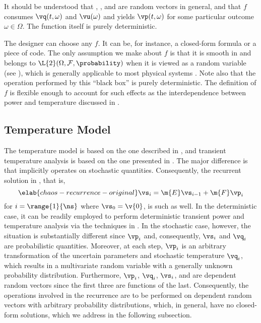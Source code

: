 \begin{remark}
It should be understood that \vp, \vq, and \vu are random vectors in general,
and that $f$ consumes $\vq(t, \omega)$ and $\vu(\omega)$ and yields $\vp(t,
\omega)$ for some particular outcome $\omega \in \Omega$. The function itself is
purely deterministic.
\end{remark}

The designer can choose any $f$. It can be, for instance, a closed-form formula
or a piece of code. The only assumption we make about $f$ is that it is smooth
in \vz and belongs to $\L{2}(\Omega, \mathcal{F}, \probability)$ when it is
viewed as a random variable (see ), which is generally
applicable to most physical systems \cite{xiu2010}. Note also that the operation
performed by this ``black box'' is purely deterministic. The definition of $f$
is flexible enough to account for such effects as the interdependence between
power and temperature discussed in .

\subsection{Temperature Model}

The temperature model is based on the one described in ,
and transient temperature analysis is based on the one presented in
. The major difference is that
 implicitly operates on stochastic quantities.
Consequently, the recurrent solution in , that
is,
\begin{equation} \elab{chaos-recurrence-original}
  \vs_i = \m{E} \vs_{i - 1} + \m{F} \vp_i
\end{equation}
for $i = \range{1}{\ns}$ where $\vs_0 = \v{0}$, is such as well. In the
deterministic case, it can be readily employed to perform deterministic
transient power and temperature analysis via the techniques in
. In the stochastic case, however, the
situation is substantially different since $\vp_i$ and, consequently, $\vs_i$
and $\vq_i$ are probabilistic quantities. Moreover, at each step, $\vp_i$ is an
arbitrary transformation of the uncertain parameters \vu and stochastic
temperature $\vq_i$, which results in a multivariate random variable with a
generally unknown probability distribution. Furthermore, $\vp_i$, $\vq_i$,
$\vs_i$, and \vu are dependent random vectors since the first three are
functions of the last. Consequently, the operations involved in the recurrence
are to be performed on dependent random vectors with arbitrary probability
distributions, which, in general, have no closed-form solutions, which we
address in the following subsection.

